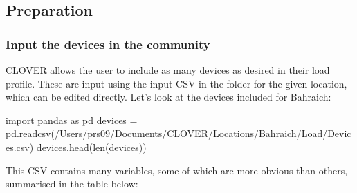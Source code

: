 \documentclass[letterpaper,10pt,english]{sphinxmanual}
\begin{document}
\subsection{Preparation}
\label{\detokenize{load:preparation}}

\subsubsection{Input the devices in the community}
\label{\detokenize{load:input-the-devices-in-the-community}}
\sphinxAtStartPar
CLOVER allows the user to include as many devices as desired in their
load profile. These are input using the  input CSV in the
 folder for the given location, which can be edited directly.
Let’s look at the devices included for Bahraich:

\begin{sphinxVerbatim}[commandchars=\\\{\}]
import pandas as pd
devices = pd.read\PYGZus{}csv(\PYGZdq{}/Users/prs09/Documents/CLOVER/Locations/Bahraich/Load/Devices.csv\PYGZdq{})
devices.head(len(devices))
\end{sphinxVerbatim}



\begin{DUlineblock}{0em}
\item[] 
\end{DUlineblock}

\sphinxAtStartPar
This CSV contains many variables, some of which are more obvious than
others, summarised in the table below:
\end{document}
